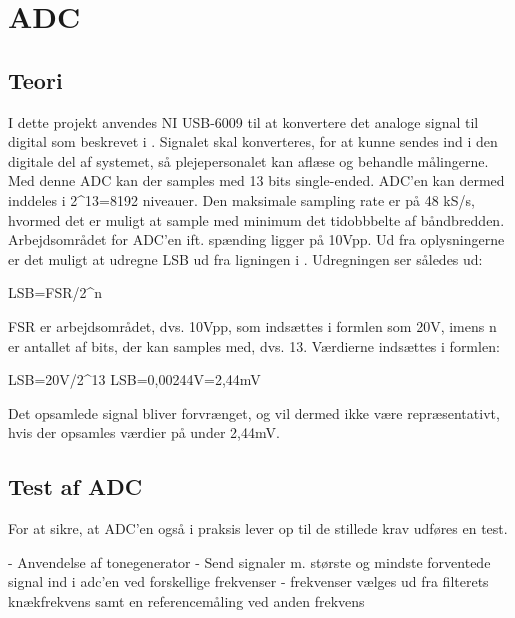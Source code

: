 \section{ADC}

\subsection{Teori}
I dette projekt anvendes NI USB-6009 til at konvertere det analoge signal til digital som beskrevet i . Signalet skal konverteres, for at kunne sendes ind i den digitale del af systemet, så plejepersonalet kan aflæse og behandle målingerne. Med denne ADC kan der samples med 13 bits single-ended. ADC'en kan dermed inddeles i 2^13=8192 niveauer. Den maksimale sampling rate er på 48 kS/s, hvormed det er muligt at sample med minimum det tidobbbelte af båndbredden. Arbejdsområdet for ADC'en ift. spænding ligger på 10Vpp. \cite{Instruments2014} Ud fra oplysningerne er det muligt at udregne LSB ud fra ligningen i . Udregningen ser således ud: \\
\begin{center}
	LSB=FSR/2^n 
\end{center}  
FSR er arbejdsområdet, dvs. 10Vpp, som indsættes i formlen som 20V, imens n er antallet af bits, der kan samples med, dvs. 13.
Værdierne indsættes i formlen: \\
\begin{center}
	LSB=20V/2^13
	LSB=0,00244V=2,44mV
\end{center}
Det opsamlede signal bliver forvrænget, og vil dermed ikke være repræsentativt, hvis der opsamles værdier på under 2,44mV. 

\subsection{Test af ADC}
For at sikre, at ADC'en også i praksis lever op til de stillede krav udføres en test.

- Anvendelse af tonegenerator
- Send signaler m. største og mindste forventede signal ind i adc'en ved forskellige frekvenser - frekvenser vælges ud fra filterets knækfrekvens samt en referencemåling ved anden frekvens